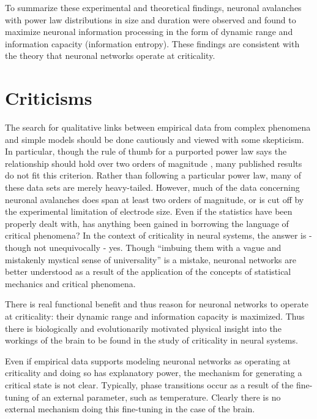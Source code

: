 \documentclass[12pt]{article}
\begin{document}
To summarize these experimental and theoretical findings, neuronal avalanches with power law distributions in size and duration were observed and found to maximize neuronal information processing in the form of dynamic range and information capacity (information entropy). These findings are consistent with the theory that neuronal networks operate at criticality. 



\section*{Criticisms} The search for qualitative links between empirical data from complex phenomena and simple models should be done cautiously and viewed with some skepticism. In particular, though the rule of thumb for a purported power law says the relationship should hold over two orders of magnitude \cite{Sethna2011a}, many published results do not fit this criterion. Rather than following a particular power law, many of these data sets are merely heavy-tailed. However, much of the data concerning neuronal avalanches does span at least two orders of magnitude, or is cut off by the experimental limitation of electrode size. Even if the statistics have been properly dealt with, has anything been gained in borrowing the language of critical phenomena? In the context of criticality in neural systems, the answer is - though not unequivocally - yes. Though ``imbuing them with a vague and mistakenly mystical sense of universality'' \cite{Stumpf2012a} is a mistake, neuronal networks are better understood as a result of the application of the concepts of statistical mechanics and critical phenomena. 

There is real functional benefit and thus reason for neuronal networks to operate at criticality: their dynamic range and information capacity is maximized. Thus there is biologically and evolutionarily motivated physical insight into the workings of the brain to be found in the study of criticality in neural systems.

Even if empirical data supports modeling neuronal networks as operating at criticality and doing so has explanatory power, the mechanism for generating a critical state is not clear. Typically, phase transitions occur as a result of the fine-tuning of an external parameter, such as temperature. Clearly there is no external mechanism doing this fine-tuning in the case of the brain. 
\end{document}
